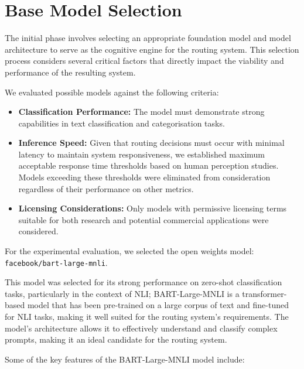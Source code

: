 \section{Base Model Selection}

The initial phase involves selecting an appropriate foundation model and model architecture to serve as the cognitive engine for the routing system. This selection process considers several critical factors that directly impact the viability and performance of the resulting system.

We evaluated possible models against the following criteria:

\begin{itemize}
    \item \textbf{Classification Performance:} The model must demonstrate strong capabilities in text classification and categorisation tasks.
    \item \textbf{Inference Speed:} Given that routing decisions must occur with minimal latency to maintain system responsiveness, we established maximum acceptable response time thresholds based on human perception studies. Models exceeding these thresholds were eliminated from consideration regardless of their performance on other metrics.
    \item \textbf{Licensing Considerations:} Only models with permissive licensing terms suitable for both research and potential commercial applications were considered.
\end{itemize}

For the experimental evaluation, we selected the open weights model: \texttt{facebook/bart-large-mnli}.

This model was selected for its strong performance on zero-shot classification tasks, particularly in the context of NLI; BART-Large-MNLI is a transformer-based model that has been pre-trained on a large corpus of text and fine-tuned for NLI tasks, making it well suited for the routing system's requirements. The model's architecture allows it to effectively understand and classify complex prompts, making it an ideal candidate for the routing system.

Some of the key features of the BART-Large-MNLI model include:

